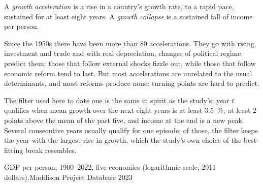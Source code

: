 \begin{definition}\label{def:b3:growth-empirics:acceleration}
A \emph{growth acceleration} is a rise in a country's growth rate, to a rapid pace,
sustained for at least eight years. A \emph{growth collapse} is a sustained fall of
income per person.
\end{definition}

Since the 1950s there have been more than 80 accelerations. They go with rising investment
and trade and with real depreciation; changes of political regime predict them;
those that follow external shocks fizzle out, while those that follow economic
reform tend to last. But most accelerations are unrelated to the usual determinants,
and most reforms produce none: turning points are hard to predict.

The filter used here to date one is the same in spirit as the study's: year $t$
qualifies when mean growth over the next eight years is at least 3.5~\%, at least 2
points above the mean of the past five, and income at the end is a new peak. Several
consecutive years usually qualify for one episode; of those, the filter keeps the year
with the largest rise in growth, which the study's own choice of the best-fitting
break resembles.

\begin{omchart}{GDP per person, 1900--2022, five economies (logarithmic scale, 2011
dollars).}{Maddison Project Database 2023}
\end{omchart}

